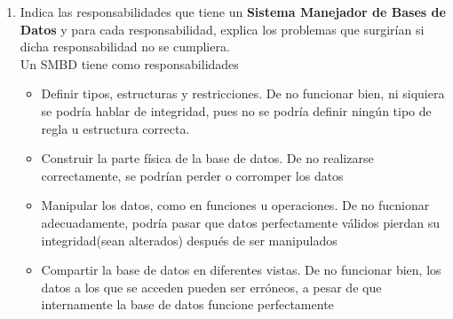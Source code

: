\documentclass[10pt]{article}
\begin{document}
\begin{enumerate}[label=\alph*.]
        \item {
            Indica las responsabilidades que tiene un \textbf{Sistema Manejador
            de Bases de Datos} y para cada responsabilidad, explica los problemas
            que surgirían si dicha responsabilidad no se cumpliera. \\
            Un SMBD tiene como responsabilidades
            \begin{itemize}
                \item {Definir tipos, estructuras y restricciones. De no 
                funcionar bien, ni siquiera se podría hablar de integridad, pues
                no se podría definir ningún tipo de regla u estructura correcta.}
                \item {Construir la parte física de la base de datos. De no 
                realizarse correctamente, se podrían perder o corromper los datos}
                \item {Manipular los datos, como en funciones u operaciones. De
                no fucnionar adecuadamente, podría pasar que datos perfectamente
                válidos pierdan su integridad(sean alterados) después de ser 
                manipulados}
                \item {Compartir la base de datos en diferentes vistas. De no 
                funcionar bien, los datos a los que se acceden pueden ser erróneos,
                a pesar de que internamente la base de datos funcione 
                perfectamente}\\
            \end{itemize}
        }
    

\end{enumerate}
\end{document}
